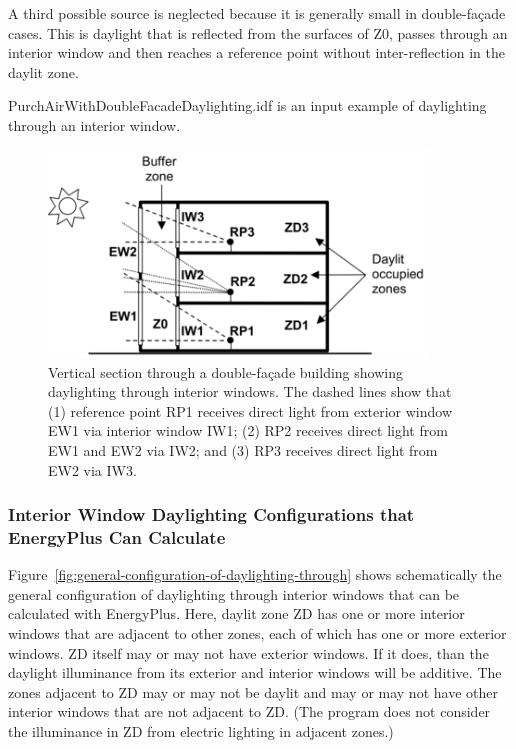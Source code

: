 A third possible source is neglected because it is generally small in double-façade cases. This is daylight that is reflected from the surfaces of Z0, passes through an interior window and then reaches a reference point without inter-reflection in the daylit zone.

PurchAirWithDoubleFacadeDaylighting.idf is an input example of daylighting through an interior window.

\begin{figure}[hbtp] %
\centering
\includegraphics[width=0.9\textwidth, height=0.9\textheight, keepaspectratio=true]{media/image102.png}
\caption{Vertical section through a double-façade building showing daylighting through interior windows. The dashed lines show that (1) reference point RP1 receives direct light from exterior window EW1 via interior window IW1; (2) RP2 receives direct light from EW1 and EW2 via IW2; and (3) RP3 receives direct light from EW2 via IW3. \protect \label{fig:vertical-section-through-a-double-faade}}
\end{figure}

\subsubsection{Interior Window Daylighting Configurations that EnergyPlus Can Calculate}\label{interior-window-daylighting-configurations-that-energyplus-can-calculate}

Figure~\ref{fig:general-configuration-of-daylighting-through} shows schematically the general configuration of daylighting through interior windows that can be calculated with EnergyPlus. Here, daylit zone ZD has one or more interior windows that are adjacent to other zones, each of which has one or more exterior windows. ZD itself may or may not have exterior windows. If it does, than the daylight illuminance from its exterior and interior windows will be additive. The zones adjacent to ZD may or may not be daylit and may or may not have other interior windows that are not adjacent to ZD. (The program does not consider the illuminance in ZD from electric lighting in adjacent zones.)

